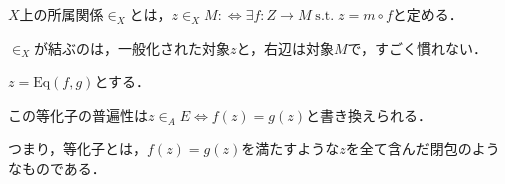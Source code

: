 \documentclass[uplatex, 12pt, dvipdfmx]{jsarticle}
\begin{document}
\begin{definition*}
    $X$上の所属関係$\in_X$とは，$z\in_XM:\Leftrightarrow \exists f:Z\to M\;\mathrm{s.t.}\; z=m\circ f$と定める．
    \begin{center}
    \end{center}
\end{definition*}
\begin{remark*}
    $\in_X$が結ぶのは，一般化された対象$z$と，右辺は対象$M$で，すごく慣れない．
\end{remark*}

\begin{example}[等化子の普遍性を局所包含関係の言葉で書き換えられる．]
    $z=\mathrm{Eq}(f,g)$とする．
    \begin{center}
    \end{center}
    この等化子の普遍性は$z\in_AE\Leftrightarrow f(z)=g(z)$と書き換えられる．
    \begin{center}
    \end{center}
    つまり，等化子とは，$f(z)=g(z)$を満たすような$z$を全て含んだ閉包のようなものである．
\end{example}
\end{document}
